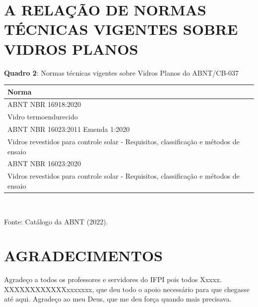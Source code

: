 \documentclass[12pt, a4paper]{article}
\begin{document}
\section*{A RELAÇÃO DE NORMAS TÉCNICAS VIGENTES SOBRE VIDROS PLANOS}

\vspace{0.5cm}
\begin{center}
    \textbf{Quadro 2}: Normas técnicas vigentes sobre Vidros Planos do ABNT/CB-037 \\[0.2cm]
    \small
    \begin{tabular}{p{15cm}}
        \toprule
        \textbf{Norma} \\
        \midrule
        ABNT NBR 16918:2020 \\
        Vidro termoendurecido \\
        \midrule
        ABNT NBR 16023:2011 Emenda 1:2020 \\
        Vidros revestidos para controle solar - Requisitos, classificação e métodos de ensaio \\
        \midrule
        ABNT NBR 16023:2020 \\
        Vidros revestidos para controle solar - Requisitos, classificação e métodos de ensaio \\
        \bottomrule
    \end{tabular}\\[0.2cm]
    \raggedright \small Fonte: Catálogo da ABNT (2022).
\end{center}

\clearpage

\section*{AGRADECIMENTOS}

Agradeço a todos os professores e servidores do IFPI pois todos Xxxxx. XXXXXXXXXXXXxxxxxxx, que deu todo o apoio necessário para que chegasse até aqui. Agradeço ao meu Deus, que me deu força quando mais precisava.
\end{document}
